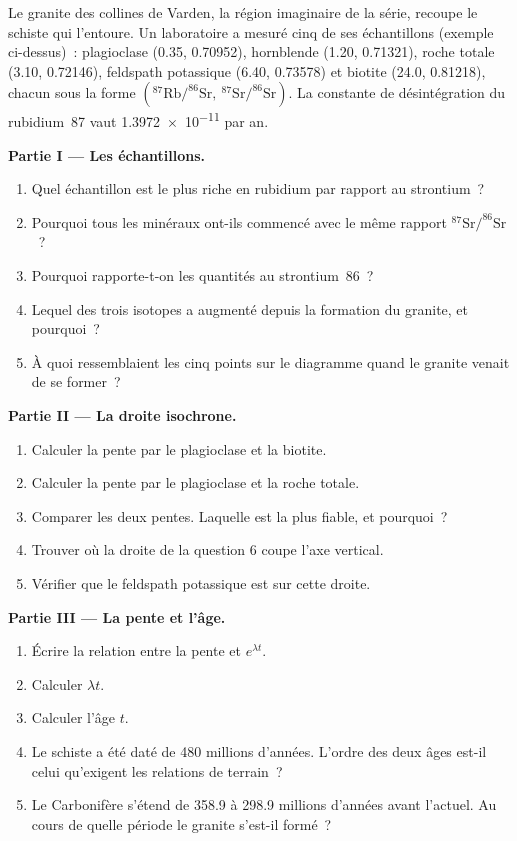 \begin{problem}
\label{pb:g12:age-of-the-earth:1}
Le granite des collines de Varden, la région imaginaire de la série,
recoupe le schiste qui l'entoure. Un laboratoire a mesuré cinq de ses
échantillons (exemple ci-dessus)~: plagioclase (0.35, 0.70952), hornblende
(1.20, 0.71321), roche totale (3.10, 0.72146), feldspath potassique (6.40,
0.73578) et biotite (24.0, 0.81218), chacun sous la forme
$(^{87}\mathrm{Rb}/^{86}\mathrm{Sr},\ ^{87}\mathrm{Sr}/^{86}\mathrm{Sr})$. La
constante de désintégration du rubidium~87 vaut \num{1.3972e-11} par an.

\medskip
\noindent\textbf{Partie I --- Les échantillons.}
\begin{enumerate}
  \item Quel échantillon est le plus riche en rubidium par rapport au
        strontium~?
  \item Pourquoi tous les minéraux ont-ils commencé avec le même rapport
        $^{87}\mathrm{Sr}/^{86}\mathrm{Sr}$~?
  \item Pourquoi rapporte-t-on les quantités au strontium~86~?
  \item Lequel des trois isotopes a augmenté depuis la formation du
        granite, et pourquoi~?
  \item À quoi ressemblaient les cinq points sur le diagramme quand le
        granite venait de se former~?
\end{enumerate}

\medskip
\noindent\textbf{Partie II --- La droite isochrone.}
\begin{enumerate}[resume]
  \item Calculer la pente par le plagioclase et la biotite.
  \item Calculer la pente par le plagioclase et la roche totale.
  \item Comparer les deux pentes. Laquelle est la plus fiable, et pourquoi~?
  \item Trouver où la droite de la question 6 coupe l'axe vertical.
  \item Vérifier que le feldspath potassique est sur cette droite.
\end{enumerate}

\medskip
\noindent\textbf{Partie III --- La pente et l'âge.}
\begin{enumerate}[resume]
  \item Écrire la relation entre la pente et $e^{\lambda t}$.
  \item Calculer $\lambda t$.
  \item Calculer l'âge $t$.
  \item Le schiste a été daté de 480 millions d'années. L'ordre des deux
        âges est-il celui qu'exigent les relations de terrain~?
  \item Le Carbonifère s'étend de 358.9 à 298.9 millions d'années avant
        l'actuel. Au cours de quelle période le granite s'est-il formé~?
\end{enumerate}


\end{problem}
